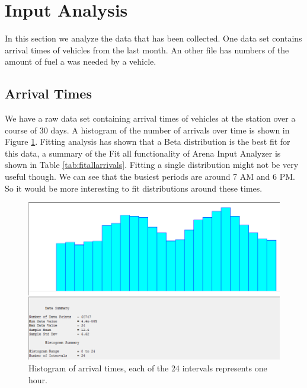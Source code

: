 \section{Input Analysis}

In this section we analyze the data that has been collected. One data set contains arrival times of vehicles from the last month. An other file has numbers of the amount of fuel a was needed by a vehicle. 

\subsection{Arrival Times}

We have a raw data set containing arrival times of vehicles at the station over a course of 30 days. 
A histogram of the number of arrivals over time is shown in Figure \ref{fig:histogram-arrivals}. 
Fitting analysis has shown that a Beta distribution is the best fit for this data, a summary of the Fit all functionality of Arena Input Analyzer is shown in Table \ref{tab:fitallarrivals}. Fitting a single distribution might not be very useful though. We can see that the busiest periods are around 7 AM and 6 PM. So it would be more interesting to fit distributions around these times. 

\begin{figure}[h]
	\includegraphics[width=\textwidth]{images/histogram-arrivals.PNG}
	\caption{Histogram of arrival times, each of the 24 intervals represents one hour.}
	\label{fig:histogram-arrivals}
\end{figure}

